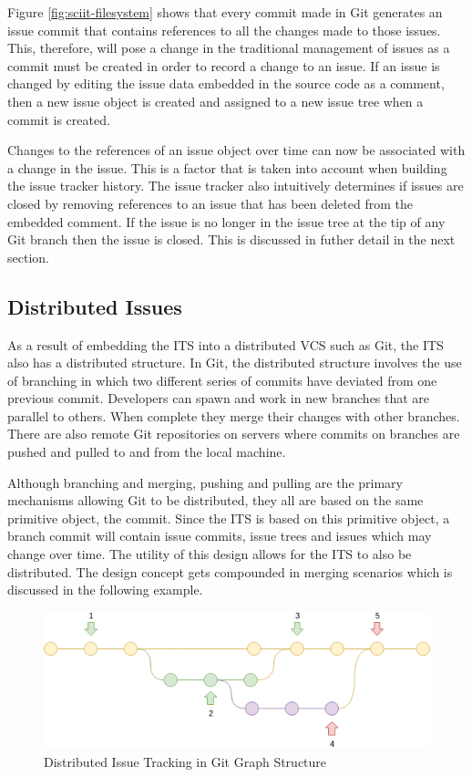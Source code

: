 \documentclass{mproj}
\begin{document}
Figure \ref{fig:sciit-filesystem} shows that every commit made in Git generates an issue commit that contains references to all the changes made to those issues. This, therefore, will pose a change in the traditional management of issues as a commit must be created in order to record a change to an issue. If an issue is changed by editing the issue data embedded in the source code as a comment, then a new issue object is created and assigned to a new issue tree when a commit is created. 

Changes to the references of an issue object over time can now be associated with a change in the issue. This is a factor that is taken into account when building the issue tracker history. The issue tracker also intuitively determines if issues are closed by removing references to an issue that has been deleted from the embedded comment. If the issue is no longer in the issue tree at the tip of any Git branch then the issue is closed. This is discussed in futher detail in the next section.

\subsection{Distributed Issues}

As a result of embedding the ITS into a distributed VCS such as Git, the ITS also has a distributed structure. In Git, the distributed structure involves the use of branching in which two different series of commits have deviated from one previous commit. Developers can spawn and work in new branches that are parallel to others. When complete they merge their changes with other branches. There are also remote Git repositories on servers where commits on branches are pushed and pulled to and from the local machine.

Although branching and merging, pushing and pulling are the primary mechanisms allowing Git to be distributed, they all are based on the same primitive object, the commit. Since the ITS is based on this primitive object, a branch commit will contain issue commits, issue trees and issues which may change over time. The utility of this design allows for the ITS to also be distributed. The design concept gets compounded in merging scenarios which is discussed in the following example.


\begin{figure}[h!]
\caption{Distributed Issue Tracking in Git Graph Structure}
\label{fig:distributed-issue-tracking}
\centering
\includegraphics[width=15cm]{distributed-issue-tracking}
\end{figure}
\end{document}
